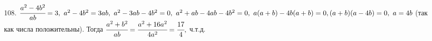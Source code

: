 108. $\cfrac{a^2-4b^2}{ab}=3,\ a^2-4b^2=3ab,\ a^2-3ab-4b^2=0,\ a^2+ab-4ab-4b^2=0,\ a(a+b)-4b(a+b)=0, (a+b)(a-4b)=0,\ a=4b$ (так как числа положительны). Тогда
$\cfrac{a^2+b^2}{ab}=\cfrac{a^2+16a^2}{4a^2}=\cfrac{17}{4},$ ч.т.д.\\
